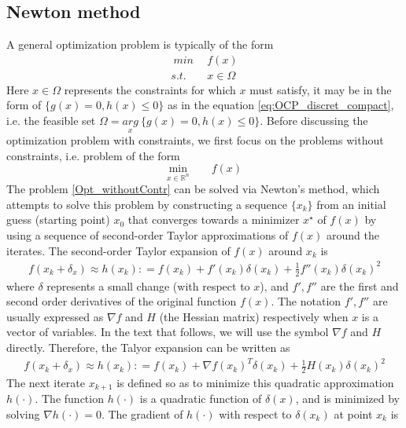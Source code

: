 \documentclass  [
  paper    = a4,
  BCOR     = 10mm,
  twoside,
  fontsize = 12pt,
  fleqn,
  toc      = bibnumbered,
  toc      = listofnumbered,
  numbers  = noendperiod,
  headings = normal,
  listof   = leveldown,
  version  = 3.03
]                                       {scrreprt}
\newcommand{\<}{\langle}
\renewcommand{\>}{\rangle}
\begin{document}
\subsection{Newton method}
A general optimization problem is typically of the form 
\begin{equation}
	\begin{aligned}
		\    min &\ \   f(x) \\
		s.t.  & \ \ x \in \Omega
	\end{aligned}
	\label{OptGen}
\end{equation}
Here $x \in \Omega$ represents the constraints for which $x$ must satisfy, it may be in the form of $\{g(x) = 0,  h(x)  \leq  0 \}$ as in the equation \ref{eq:OCP_discret_compact}, i.e. the feasible set $\Omega = \underset{x}{arg} \ \{ g(x) = 0,  h(x)  \leq  0 \}$. Before discussing the optimization problem with constraints, we first focus on the problems without constraints, i.e. problem of the form
\begin{equation}
	\underset{x \in \mathbb{R}^n}{\text{min}} \qquad f(x)	
	\label{Opt_withoutContr}
\end{equation}
The problem \ref{Opt_withoutContr} can be solved via Newton's method, which attempts to solve this problem by constructing a sequence $\{x_k\}$ from an initial guess (starting point) $x_0$ that converges towards a minimizer $x^\star$ of $f(x)$  by using a sequence of second-order Taylor approximations of $f(x)$ around the iterates. The second-order Taylor expansion of $f(x)$ around $x_k$ is
\begin{align*}
	f(x_k + \delta_x) \approx h(x_k) : = f(x_k) + f'(x_k)\delta(x_k) +\frac{1}{2}f''(x_k)\delta(x_k)^2 
\end{align*}
where $\delta$ represents a small change (with respect to $x$), and $f', f''$ are the first and second order derivatives of the original function $f(x)$. The notation $f', f''$ are usually expressed as $\nabla f$ and  $H$ (the Hessian matrix) respectively when $x$ is a vector of variables. In the text that follows, we will use the symbol $\nabla f$ and $H$ directly. Therefore, the Talyor expansion can be written as 
\begin{align*}
	f(x_k + \delta_x) \approx h(x_k) : = f(x_k) + \nabla f(x_k)^T\delta(x_k) +\frac{1}{2}H(x_k)\delta(x_k)^2 
\end{align*}
The next iterate $x_{k+1}$ is defined so as to minimize this quadratic approximation $h(\cdot)$. The function $h(\cdot)$ is a quadratic function of $\delta(x)$, and is minimized by solving $\nabla h(\cdot) = 0$. The gradient of $h(\cdot)$ with respect to $\delta(x_k)$ at point $x_k$ is
\end{document}

